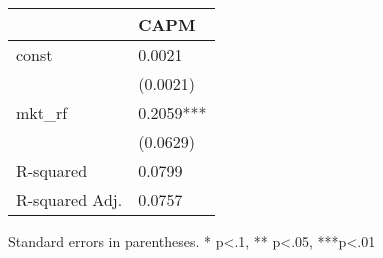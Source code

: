 \begin{table}
\caption{}
\label{}
\begin{center}
\begin{tabular}{ll}
\hline
               & CAPM       \\
\hline
const          & 0.0021     \\
               & (0.0021)   \\
mkt\_rf        & 0.2059***  \\
               & (0.0629)   \\
R-squared      & 0.0799     \\
R-squared Adj. & 0.0757     \\
\hline
\end{tabular}
\end{center}
\end{table}
\bigskip
Standard errors in parentheses. \newline 
* p<.1, ** p<.05, ***p<.01
